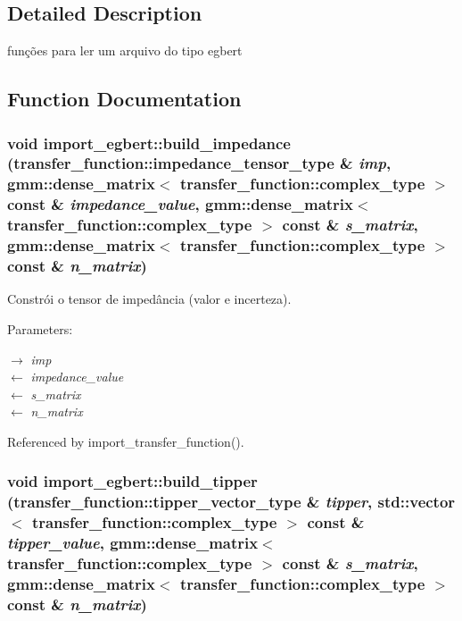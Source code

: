 \subsection{Detailed Description}
funções para ler um arquivo do tipo egbert 

\subsection{Function Documentation}
\subsubsection{\setlength{\rightskip}{0pt plus 5cm}void import\_\-egbert::build\_\-impedance (transfer\_\-function::impedance\_\-tensor\_\-type \& {\em imp}, \/  gmm::dense\_\-matrix$<$ transfer\_\-function::complex\_\-type $>$ const \& {\em impedance\_\-value}, \/  gmm::dense\_\-matrix$<$ transfer\_\-function::complex\_\-type $>$ const \& {\em s\_\-matrix}, \/  gmm::dense\_\-matrix$<$ transfer\_\-function::complex\_\-type $>$ const \& {\em n\_\-matrix})}\label{namespaceimport__egbert_0ebf4a1dfc8e75a74b6a89ae8d2876db}


Constrói o tensor de impedância (valor e incerteza). 

\begin{Desc}
\item[Parameters:]
\begin{description}
\item[\mbox{$\rightarrow$} {\em imp}]\item[\mbox{$\leftarrow$} {\em impedance\_\-value}]\item[\mbox{$\leftarrow$} {\em s\_\-matrix}]\item[\mbox{$\leftarrow$} {\em n\_\-matrix}]\end{description}
\end{Desc}


Referenced by import\_\-transfer\_\-function().
\subsubsection{\setlength{\rightskip}{0pt plus 5cm}void import\_\-egbert::build\_\-tipper (transfer\_\-function::tipper\_\-vector\_\-type \& {\em tipper}, \/  std::vector$<$ transfer\_\-function::complex\_\-type $>$ const \& {\em tipper\_\-value}, \/  gmm::dense\_\-matrix$<$ transfer\_\-function::complex\_\-type $>$ const \& {\em s\_\-matrix}, \/  gmm::dense\_\-matrix$<$ transfer\_\-function::complex\_\-type $>$ const \& {\em n\_\-matrix})}\label{namespaceimport__egbert_66693da5f17a7e231bca27a8faff7270}


